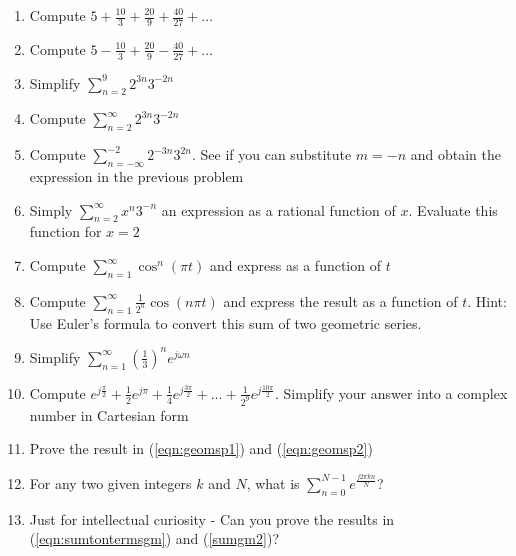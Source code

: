\begin{enumerate}

\item Compute $5+\frac{10}{3}+\frac{20}{9}+\frac{40}{27}+ \ldots$

\item Compute $5-\frac{10}{3}+\frac{20}{9}-\frac{40}{27}+ \ldots$

\item Simplify $\sum\limits_{n=2}^{9} 2^{3n} 3^{-2n}$

\item Compute $\sum\limits_{n=2}^{\infty} 2^{3n} 3^{-2n}$

\item Compute $\sum\limits_{n=-\infty}^{-2} 2^{-3n} 3^{2n}$. See if you can substitute $m = -n$ and obtain the expression in the previous problem

\item Simply $\sum\limits_{n=2}^{\infty} x^n 3^{-n}$ an expression as a rational function of $x$. Evaluate this function for $x=2$

\item Compute $\sum\limits_{n=1}^{\infty} \cos^n (\pi t)$ and express as a function of $t$

\item Compute $\sum\limits_{n=1}^{\infty} \frac{1}{2^n}\cos(n \pi t)$ and express the result as a function of $t$. Hint: Use Euler's formula to convert this sum of two geometric series.

\item Simplify $\sum\limits_{n=1}^{\infty} \left(\frac{1}{3} \right)^n e^{j \omega n}$

\item Compute $e^{j\frac{\pi}{2}}+\frac{1}{2} e^{{j \pi}} + \frac{1}{4} e^{j\frac{3 \pi}{2}} + \ldots + \frac{1}{2^9} e^{j\frac{10 \pi}{2}}$. Simplify your answer into a complex number in Cartesian form



\item Prove the result in (\ref{eqn:geomsp1}) and (\ref{eqn:geomsp2})
\item For any two given integers $k$ and $N$, what is
$\displaystyle{\sum_{n=0}^{N-1} e^{\frac{j 2 \pi k n}{N}}}$?

\item Just for intellectual curiosity - Can you prove the results in (\ref{eqn:sumtontermsgm}) and (\ref{sumgm2})?

\end{enumerate}

